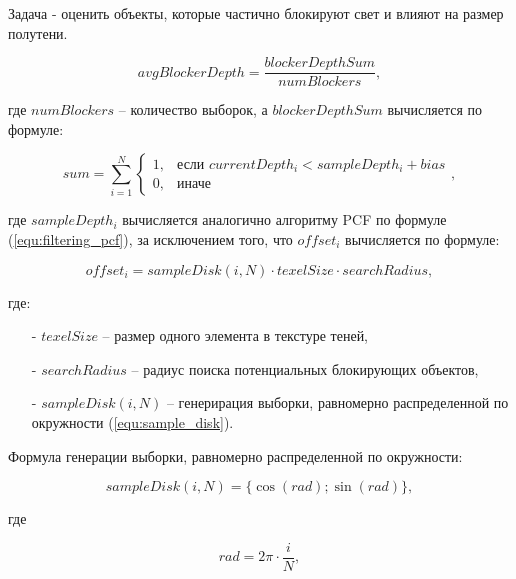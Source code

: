 Задача - оценить объекты, которые частично блокируют свет и влияют на размер полутени.

\begin{equation}
    \label{equ:search_blocker}
    avgBlockerDepth = \frac{blockerDepthSum}{numBlockers},
\end{equation}

\noindent где $numBlockers$ -- количество выборок,
а $blockerDepthSum$ вычисляется по формуле:

\begin{equation}
    \label{euq:blocker_depth_sum}
    sum = \sum_{i = 1}^{N}
    \begin{cases}
        1, & \text{если $currentDepth_i < sampleDepth_i + bias$} \\
        0, & \text{иначе}
    \end{cases},
\end{equation}

\noindent где $sampleDepth_i$ вычисляется аналогично алгоритму PCF по формуле (\ref{equ:filtering_pcf}),
за исключением того, что $offset_i$ вычисляется по формуле:

\begin{equation}
    \label{equ:offset_pcss}
    offset_i = sampleDisk(i, N) \cdot texelSize \cdot searchRadius,
\end{equation}

\noindent где:

\begin{itemize}
    \item[-] $texelSize$ -- размер одного элемента в текстуре теней,
    \item[-] $searchRadius$ -- радиус поиска потенциальных блокирующих объектов, 
    \item[-] $sampleDisk(i, N)$ -- генерирация выборки, равномерно распределенной по окружности (\ref{equ:sample_disk}).
\end{itemize}

Формула генерации выборки, равномерно распределенной по окружности:

\begin{equation}
    \label{equ:sample_disk}
    sampleDisk(i, N) = \{\cos(rad); \sin(rad)\},    
\end{equation}

\noindent где

\begin{equation*}
    rad = 2 \pi \cdot\frac{i}{N},
\end{equation*}

